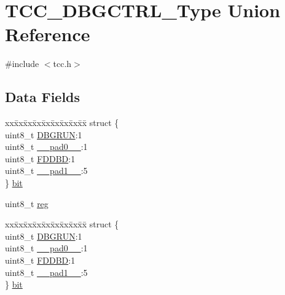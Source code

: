 \hypertarget{union_t_c_c___d_b_g_c_t_r_l___type}{}\section{T\+C\+C\+\_\+\+D\+B\+G\+C\+T\+R\+L\+\_\+\+Type Union Reference}
\label{union_t_c_c___d_b_g_c_t_r_l___type}


{\ttfamily \#include $<$tcc.\+h$>$}

\subsection*{Data Fields}
\begin{DoxyCompactItemize}
\item 
\begin{tabbing}
xx\=xx\=xx\=xx\=xx\=xx\=xx\=xx\=xx\=\kill
struct \{\\
\>uint8\_t \mbox{\hyperlink{union_t_c_c___d_b_g_c_t_r_l___type_a1e1cc79f6834369b9dd0c6676a0d8781}{DBGRUN}}:1\\
\>uint8\_t \mbox{\hyperlink{union_t_c_c___d_b_g_c_t_r_l___type_a8b4eebe79ded0459acec2f4950102ba3}{\_\_pad0\_\_}}:1\\
\>uint8\_t \mbox{\hyperlink{union_t_c_c___d_b_g_c_t_r_l___type_a57af8243cff4120d702c9a1191932798}{FDDBD}}:1\\
\>uint8\_t \mbox{\hyperlink{union_t_c_c___d_b_g_c_t_r_l___type_a77f12d2e278bd5c07712648ac0df5e08}{\_\_pad1\_\_}}:5\\
\} \mbox{\hyperlink{union_t_c_c___d_b_g_c_t_r_l___type_af50477311e67da35952a9512fc555b61}{bit}}\\

\end{tabbing}\item 
uint8\+\_\+t \mbox{\hyperlink{union_t_c_c___d_b_g_c_t_r_l___type_a9428adc9af4653a2050e2536b55dec8d}{reg}}
\item 
\begin{tabbing}
xx\=xx\=xx\=xx\=xx\=xx\=xx\=xx\=xx\=\kill
struct \{\\
\>uint8\_t \mbox{\hyperlink{union_t_c_c___d_b_g_c_t_r_l___type_a1e1cc79f6834369b9dd0c6676a0d8781}{DBGRUN}}:1\\
\>uint8\_t \mbox{\hyperlink{union_t_c_c___d_b_g_c_t_r_l___type_a8b4eebe79ded0459acec2f4950102ba3}{\_\_pad0\_\_}}:1\\
\>uint8\_t \mbox{\hyperlink{union_t_c_c___d_b_g_c_t_r_l___type_a57af8243cff4120d702c9a1191932798}{FDDBD}}:1\\
\>uint8\_t \mbox{\hyperlink{union_t_c_c___d_b_g_c_t_r_l___type_a77f12d2e278bd5c07712648ac0df5e08}{\_\_pad1\_\_}}:5\\
\} \mbox{\hyperlink{union_t_c_c___d_b_g_c_t_r_l___type_aa8f051953cfeff2c8d246f073eb350c7}{bit}}\\

\end{tabbing}\end{DoxyCompactItemize}


